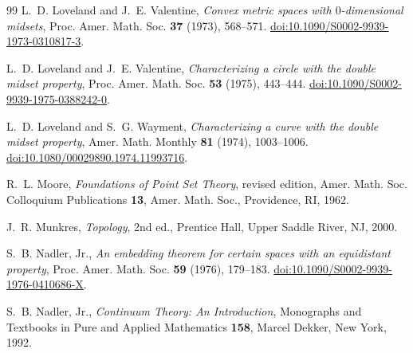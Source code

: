 \documentclass[11pt]{amsart}
\theoremstyle{definition}
\theoremstyle{remark}
\begin{document}
\begin{thebibliography}{99}
L.~D. Loveland and J.~E. Valentine, \emph{Convex metric spaces with $0$-dimensional midsets}, Proc. Amer. Math. Soc. \textbf{37} (1973), 568--571. \href{https://doi.org/10.1090/S0002-9939-1973-0310817-3}{doi:10.1090/S0002-9939-1973-0310817-3}.

L.~D. Loveland and J.~E. Valentine, \emph{Characterizing a circle with the double midset property}, Proc. Amer. Math. Soc. \textbf{53} (1975), 443--444. \href{https://doi.org/10.1090/S0002-9939-1975-0388242-0}{doi:10.1090/S0002-9939-1975-0388242-0}.

L.~D. Loveland and S.~G. Wayment, \emph{Characterizing a curve with the double midset property}, Amer. Math. Monthly \textbf{81} (1974), 1003--1006. \href{https://doi.org/10.1080/00029890.1974.11993716}{doi:10.1080/00029890.1974.11993716}.

R.~L. Moore, \emph{Foundations of Point Set Theory}, revised edition, Amer. Math. Soc. Colloquium Publications \textbf{13}, Amer. Math. Soc., Providence, RI, 1962.

J.~R. Munkres, \emph{Topology}, 2nd ed., Prentice Hall, Upper Saddle River, NJ, 2000.

S.~B. Nadler, Jr., \emph{An embedding theorem for certain spaces with an equidistant property}, Proc. Amer. Math. Soc. \textbf{59} (1976), 179--183. \href{https://doi.org/10.1090/S0002-9939-1976-0410686-X}{doi:10.1090/S0002-9939-1976-0410686-X}.

S.~B. Nadler, Jr., \emph{Continuum Theory: An Introduction}, Monographs and Textbooks in Pure and Applied Mathematics \textbf{158}, Marcel Dekker, New York, 1992.

\end{thebibliography}
\end{document}
